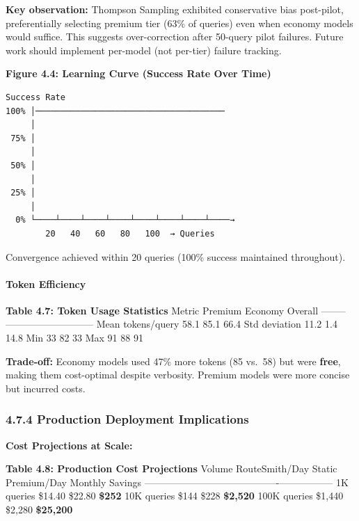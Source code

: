 \documentclass[
  11pt,
]{article}
\begin{document}
\textbf{Key observation:} Thompson Sampling exhibited conservative bias
post-pilot, preferentially selecting premium tier (63\% of queries) even
when economy models would suffice. This suggests over-correction after
50-query pilot failures. Future work should implement per-model (not
per-tier) failure tracking.

\textbf{Figure 4.4: Learning Curve (Success Rate Over Time)}

\begin{verbatim}
Success Rate
100% │──────────────────────────────────────
     │
 75% │
     │
 50% │
     │
 25% │
     │
  0% └────┴────┴────┴────┴────┴────┴────┴────→
        20   40   60   80   100  → Queries
\end{verbatim}

Convergence achieved within 20 queries (100\% success maintained
throughout).

\hypertarget{token-efficiency-1}{%
\paragraph{Token Efficiency}\label{token-efficiency-1}}

\textbf{Table 4.7: Token Usage Statistics} \textbar{} Metric \textbar{}
Premium \textbar{} Economy \textbar{} Overall \textbar{}
\textbar--------\textbar---------\textbar---------\textbar---------\textbar{}
\textbar{} Mean tokens/query \textbar{} 58.1 \textbar{} 85.1 \textbar{}
66.4 \textbar{} \textbar{} Std deviation \textbar{} 11.2 \textbar{} 1.4
\textbar{} 14.8 \textbar{} \textbar{} Min \textbar{} 33 \textbar{} 82
\textbar{} 33 \textbar{} \textbar{} Max \textbar{} 91 \textbar{} 88
\textbar{} 91 \textbar{}

\textbf{Trade-off:} Economy models used 47\% more tokens (85 vs.~58) but
were \textbf{free}, making them cost-optimal despite verbosity. Premium
models were more concise but incurred costs.

\hypertarget{production-deployment-implications-1}{%
\subsubsection{4.7.4 Production Deployment
Implications}\label{production-deployment-implications-1}}

\textbf{Cost Projections at Scale:}

\textbf{Table 4.8: Production Cost Projections} \textbar{} Volume
\textbar{} RouteSmith/Day \textbar{} Static Premium/Day \textbar{}
Monthly Savings \textbar{}
\textbar--------\textbar---------------\textbar-------------------\textbar-----------------\textbar{}
\textbar{} 1K queries \textbar{} \$14.40 \textbar{} \$22.80 \textbar{}
\textbf{\$252} \textbar{} \textbar{} 10K queries \textbar{} \$144
\textbar{} \$228 \textbar{} \textbf{\$2,520} \textbar{} \textbar{} 100K
queries \textbar{} \$1,440 \textbar{} \$2,280 \textbar{}
\textbf{\$25,200} \textbar{}
\end{document}
